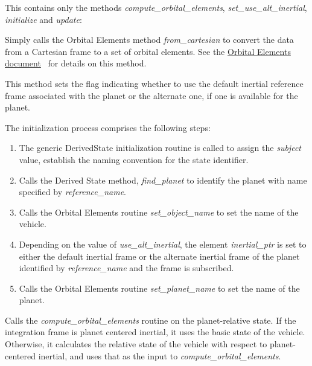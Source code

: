 \begin{itemize}

This contains only the methods \textit{compute\_orbital\_elements}, \textit{set\_use\_alt\_inertial}, \textit{initialize} and \textit{update}:
\begin{enumerate}
Simply calls the Orbital Elements method \textit{from\_cartesian} to convert the data from a Cartesian frame to a set of orbital elements.  See the 
\href{file:\JEODHOME/models/utils/orbital_elements/docs/orbital_elements.pdf}{Orbital Elements document}~\cite{dynenv:ORBITALELEMENTS} for details on this method. 

This method sets the flag indicating whether to use the default inertial reference frame associated with the planet or the alternate one, if one is available for the planet.

The initialization process comprises the following steps:
\begin{enumerate}
\item{} The generic DerivedState initialization routine is called to assign the \textit{subject} value, establish the naming convention for the state identifier.  
\item{} Calls the Derived State method, \textit{find\_planet} to identify the planet with name specified by \textit{reference\_name}.
\item{} Calls the Orbital Elements routine \textit{set\_object\_name} to set the name of the vehicle.
\item{} Depending on the value of \textit{use\_alt\_inertial}, the element \textit{inertial\_ptr} is set to either the default inertial frame or the alternate inertial frame of the planet identified by \textit{reference\_name} and the frame is subscribed.
\item{} Calls the Orbital Elements routine \textit{set\_planet\_name} to set the name of the planet.
\end{enumerate}

Calls the \textit{compute\_orbital\_elements} routine on the planet-relative state.  If the integration frame is planet centered inertial, it uses the basic state of the vehicle.  Otherwise, it calculates the relative state of the vehicle with respect to planet-centered inertial, and uses that as the input to \textit{compute\_orbital\_elements}.


\end{enumerate}
\end{itemize}
